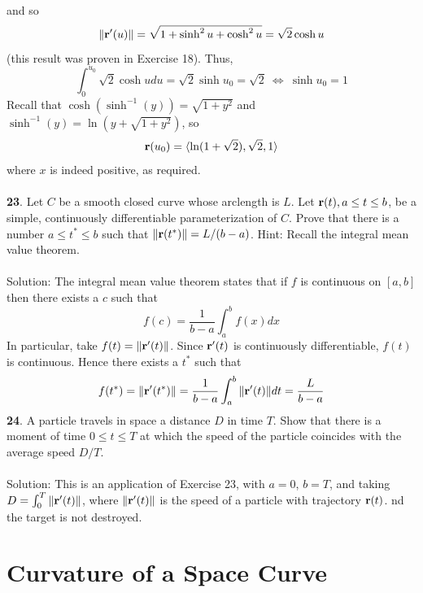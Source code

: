 \documentclass[12pt]{amsbook}
\newcommand{\la}{\langle}
\newcommand{\ra}{\rangle}
\begin{document}
and so
$$\|{\bf r}'(u)\|=\sqrt{1+\sinh^2 u +\cosh^2 u}= \sqrt{2}\cosh u$$
(this result was proven in Exercise 18).  Thus,
$$\int_0^{u_0}\sqrt{2}\cosh u du = \sqrt{2}\sinh u_0 = \sqrt{2} \ \Leftrightarrow \ \sinh u_0 =1$$
Recall that $\cosh(\sinh^{-1}(y))=\sqrt{1+y^2}$ and $\sinh^{-1}(y)=\ln (y+\sqrt{1+y^2})$, so
$${\bf r}(u_0)=\la \ln(1+\sqrt{2}), \sqrt{2}, 1 \ra$$
where $x$ is indeed positive, as required.
\\
\\
{\small\bf 23}. Let $C$ be a smooth closed curve whose arclength is $L$. Let ${\bf r}(t), a \leq t \leq b$, be a simple, continuously differentiable parameterization of $C$. Prove that
there is a number $a \leq t^{*} \leq b$
 such that $\|{\bf r}(t^{*})\|=L/(b-a)$. Hint: Recall
the integral mean value theorem.
\\
\\
{\sc Solution}: The integral mean value theorem states that if $f$ is continuous on $[a,b]$ then there exists a $c$ such that
$$f(c)=\frac{1}{b-a} \int_a^b f(x)dx$$
In particular, take $f(t)=\|{\bf r}'(t)\|$. Since ${\bf r}'(t)$ is continuously differentiable, $f(t)$ is continuous. Hence there exists a $t^*$ such that
$$f(t^*)=\|{\bf r}'(t^*)\|=\frac{1}{b-a}\int_a^b\|{\bf r}'(t)\|dt=\frac{L}{b-a}$$
{\small\bf 24}. A particle travels in space a distance $D$ in time $T$. Show that there is a
moment of time $0 \leq t \leq T$ at which the speed of the particle coincides with
the average speed $D/T$.
\\
\\
{\sc Solution}: This is an application of Exercise 23, with $a=0$, $b=T$, and taking $D=\int_0^{T}\|{\bf r}'(t)\|$, where $\|{\bf r}'(t)\|$ is the speed of a particle with trajectory ${\bf r}(t)$.
nd the target is not destroyed.

\newpage
\section{Curvature of a Space Curve}
\end{document}
